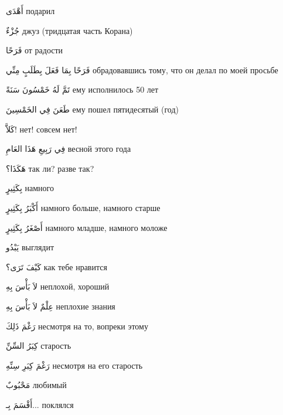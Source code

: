 \documentclass[a5paper]{article}
\newcommand\textstyleDropCaps[1]{#1}
\newcommand\textstyleCaptioncharacters[1]{#1}
\begin{document}
\textstyleCaptioncharacters{أَهْدَى }\textstyleDropCaps{подарил‎}

\textstyleCaptioncharacters{جُزْءٌ }\textstyleDropCaps{джуз (тридцатая часть Корана)‎}

\textstyleCaptioncharacters{فَرَحًا }\textstyleDropCaps{от радости‎}

\textstyleCaptioncharacters{فَرَحًا بِمَا فَعَلَ بِطَلَبٍ مِنِّي }\textstyleDropCaps{обрадовавшись тому, что он делал по моей просьбе‎}

\textstyleCaptioncharacters{تَمَّ لَهُ خَمْسُونَ سَنَةً }\textstyleDropCaps{ему исполнилось 50 лет ‎}

\textstyleCaptioncharacters{طَعَنَ فِي الخَمْسِينَ }\textstyleDropCaps{ему пошел пятидесятый (год) ‎}

\textstyleCaptioncharacters{كَلاَّ! }\textstyleDropCaps{нет! совсем нет!‎}

\textstyleCaptioncharacters{فِي رَبِيعِ هَذَا العَامِ }\textstyleDropCaps{весной этого года ‎}

\textstyleCaptioncharacters{هَكَذَا؟ }\textstyleDropCaps{так ли? разве так?‎}

\textstyleCaptioncharacters{بِكَثِيرٍ }\textstyleDropCaps{намного‎}

\textstyleCaptioncharacters{أَكْبَرُ بِكَثِيرٍ }\textstyleDropCaps{намного больше, намного старше‎}

\textstyleCaptioncharacters{أَصْغَرُ بِكَثِيرٍ }\textstyleDropCaps{намного младше, намного моложе‎}

\textstyleCaptioncharacters{يَبْدُو }\textstyleDropCaps{выглядит‎}

\textstyleCaptioncharacters{كَيْفَ تَرَى؟ }\textstyleDropCaps{как тебе нра­вится‎}

\textstyleCaptioncharacters{لاَ بَأْسَ بِهِ }\textstyleDropCaps{неплохой, хо­роший‎}

\textstyleCaptioncharacters{عِلْمٌ لاَ بَأْسَ بِهِ }\textstyleDropCaps{непло­хие знания‎}

\textstyleCaptioncharacters{رَغْمَ ذَلِكَ }\textstyleDropCaps{несмотря на то, вопреки этому‎}

\textstyleCaptioncharacters{كِبَرُ السِّنِّ }\textstyleDropCaps{старость‎}

\textstyleCaptioncharacters{رَغْمَ كِبَرِ سِنِّهِ }\textstyleDropCaps{несмот­ря на его старость‎}

\textstyleCaptioncharacters{مَحْبُوبٌ }\textstyleDropCaps{любимый‎}

\textstyleCaptioncharacters{أَقْسَمَ بِـ... }\textstyleDropCaps{поклялся‎}
\end{document}
